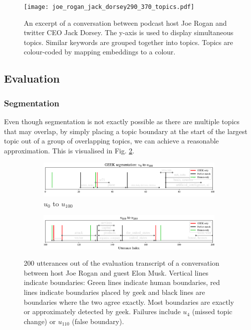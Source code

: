        \begin{figure}
            \centering
            \texttt{[image: joe\_rogan\_jack\_dorsey290\_370\_topics.pdf]}
            \caption{An excerpt of a conversation between podcast host Joe Rogan and twitter CEO Jack Dorsey. The y-axis is used to display simultaneous topics. Similar keywords are grouped together into topics. Topics are colour-coded by mapping \glspl{embedding} to a colour.}
            \label{fig:GEEK final result}
        \end{figure}

    \subsection{Evaluation}

    \subsubsection{Segmentation}
        Even though segmentation is not exactly possible as there are multiple topics that may overlap, by simply placing a topic boundary at the start of the largest topic out of a group of overlapping topics, we can achieve a reasonable approximation. This is visualised in Fig. \ref{fig:GEEK segment}.
        \begin{figure}[h]
             \centering
             \begin{subfigure}[b]{\textwidth}
                 \centering
                 \includegraphics[width=1\textwidth]{figures/0to100segment_topics.pdf}
                 \caption{$u_0$ to $u_100$}
             \end{subfigure}
             \hfill
             \begin{subfigure}[b]{\textwidth}
                 \centering
                 \includegraphics[width=1\textwidth]{figures/100to200segment_topics.pdf}
             \end{subfigure}
                \caption{200 \glspl{utterance} out of the evaluation transcript of a conversation between host Joe Rogan and guest Elon Musk. Vertical lines indicate boundaries: Green lines indicate human boundaries, red lines indicate boundaries placed by \gls{geek} and black lines are boundaries where the two agree exactly. Most boundaries are exactly or approximately detected by \gls{geek}. Failures include $u_4$ (missed topic change) or $u_{110}$ (false boundary).}
                \label{fig:GEEK segment}
        \end{figure}

